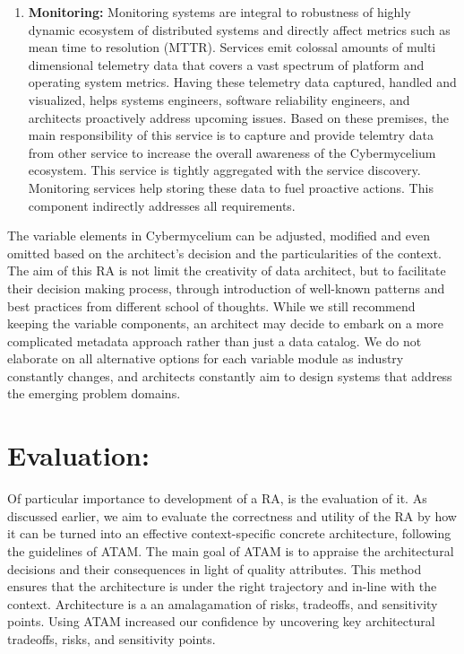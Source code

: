 \documentclass[review]{elsarticle}
\begin{document}
\begin{enumerate}
    \item \textbf{Monitoring:} Monitoring systems are integral to robustness of highly dynamic ecosystem of distributed systems and directly affect metrics such as mean time to resolution (MTTR). Services emit colossal amounts of multi dimensional telemetry data that covers a vast spectrum of platform and operating system metrics. Having these telemetry data captured, handled and visualized, helps systems engineers, software reliability engineers, and architects proactively address upcoming issues. Based on these premises, the main responsibility of this service is to capture and provide telemtry data from other service to increase the overall awareness of the Cybermycelium ecosystem. This service is tightly aggregated with the service discovery. Monitoring services help storing
    these data to fuel proactive actions. This component
    indirectly addresses all requirements.

\end{enumerate}

The variable elements in Cybermycelium can be adjusted, modified and even omitted based on the architect's decision and the particularities of the context. The aim of this RA is not limit the creativity of data architect, but to facilitate their decision making process, through introduction of well-known patterns and best practices from different school of thoughts. While we still recommend keeping the variable components, an architect may decide to embark on a more complicated metadata approach rather than just a data catalog. We do not elaborate on all alternative options for each variable module as industry constantly changes, and architects constantly aim to design systems that address the emerging problem domains. 


\section{Evaluation:}

Of particular importance to development of a RA, is the evaluation of it. As discussed earlier, we aim to evaluate the correctness and utility of the RA by how it can be turned into an effective context-specific concrete architecture, following the guidelines of ATAM. The main goal of ATAM is to appraise the architectural decisions and their consequences in light of quality attributes. This method ensures that the architecture is under the right trajectory and in-line with the context. Architecture is a an amalagamation of risks, tradeoffs, and sensitivity points. Using ATAM increased our confidence by uncovering key architectural tradeoffs, risks, and sensitivity points.
\end{document}
